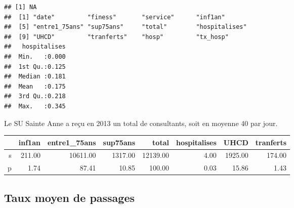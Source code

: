 \documentclass[12pt,english,french,twoside]{report}\usepackage[]{graphicx}\usepackage[]{color}
\makeatletter
\newenvironment{kframe}{%
 \def\at@end@of@kframe{}%
 \ifinner\ifhmode%
  \def\at@end@of@kframe{\end{minipage}}%
  \begin{minipage}{\columnwidth}%
 \fi\fi%
 \def\FrameCommand##1{\hskip\@totalleftmargin \hskip-\fboxsep
 \colorbox{shadecolor}{##1}\hskip-\fboxsep
     \hskip-\linewidth \hskip-\@totalleftmargin \hskip\columnwidth}%
 \MakeFramed {\advance\hsize-\width
   \@totalleftmargin\z@ \linewidth\hsize
   \@setminipage}}%
 {\par\unskip\endMakeFramed%
 \at@end@of@kframe}
\newenvironment{knitrout}{}{} %
\makeatother
\begin{document}
\begin{knitrout}
\color{fgcolor}\begin{kframe}
\begin{verbatim}
## [1] NA
##  [1] "date"         "finess"       "service"      "inf1an"      
##  [5] "entre1_75ans" "sup75ans"     "total"        "hospitalises"
##  [9] "UHCD"         "tranferts"    "hosp"         "tx_hosp"
##   hospitalises  
##  Min.   :0.000  
##  1st Qu.:0.125  
##  Median :0.181  
##  Mean   :0.175  
##  3rd Qu.:0.218  
##  Max.   :0.345
\end{verbatim}
\end{kframe}
\end{knitrout}


Le SU Sainte Anne a reçu en 2013 un total de  consultants, soit en moyenne 40 par jour.

\begin{table}[ht]
\centering
\begin{tabular}{rrrrrrrr}
  \hline
 & inf1an & entre1\_75ans & sup75ans & total & hospitalises & UHCD & tranferts \\ 
  \hline
s & 211.00 & 10611.00 & 1317.00 & 12139.00 & 4.00 & 1925.00 & 174.00 \\ 
  p & 1.74 & 87.41 & 10.85 & 100.00 & 0.03 & 15.86 & 1.43 \\ 
   \hline
\end{tabular}
\end{table}



\subsection{Taux moyen de passages}
\end{document}
